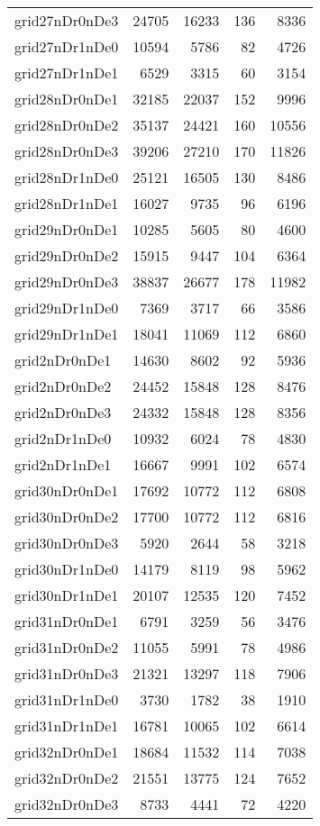 \begin{longtable}{lrrrr}
grid27nDr0nDe3 & 24705 & 16233 & 136 & 8336 \\
grid27nDr1nDe0 & 10594 & 5786 & 82 & 4726 \\
grid27nDr1nDe1 & 6529 & 3315 & 60 & 3154 \\
grid28nDr0nDe1 & 32185 & 22037 & 152 & 9996 \\
grid28nDr0nDe2 & 35137 & 24421 & 160 & 10556 \\
grid28nDr0nDe3 & 39206 & 27210 & 170 & 11826 \\
grid28nDr1nDe0 & 25121 & 16505 & 130 & 8486 \\
grid28nDr1nDe1 & 16027 & 9735 & 96 & 6196 \\
grid29nDr0nDe1 & 10285 & 5605 & 80 & 4600 \\
grid29nDr0nDe2 & 15915 & 9447 & 104 & 6364 \\
grid29nDr0nDe3 & 38837 & 26677 & 178 & 11982 \\
grid29nDr1nDe0 & 7369 & 3717 & 66 & 3586 \\
grid29nDr1nDe1 & 18041 & 11069 & 112 & 6860 \\
grid2nDr0nDe1 & 14630 & 8602 & 92 & 5936 \\
grid2nDr0nDe2 & 24452 & 15848 & 128 & 8476 \\
grid2nDr0nDe3 & 24332 & 15848 & 128 & 8356 \\
grid2nDr1nDe0 & 10932 & 6024 & 78 & 4830 \\
grid2nDr1nDe1 & 16667 & 9991 & 102 & 6574 \\
grid30nDr0nDe1 & 17692 & 10772 & 112 & 6808 \\
grid30nDr0nDe2 & 17700 & 10772 & 112 & 6816 \\
grid30nDr0nDe3 & 5920 & 2644 & 58 & 3218 \\
grid30nDr1nDe0 & 14179 & 8119 & 98 & 5962 \\
grid30nDr1nDe1 & 20107 & 12535 & 120 & 7452 \\
grid31nDr0nDe1 & 6791 & 3259 & 56 & 3476 \\
grid31nDr0nDe2 & 11055 & 5991 & 78 & 4986 \\
grid31nDr0nDe3 & 21321 & 13297 & 118 & 7906 \\
grid31nDr1nDe0 & 3730 & 1782 & 38 & 1910 \\
grid31nDr1nDe1 & 16781 & 10065 & 102 & 6614 \\
grid32nDr0nDe1 & 18684 & 11532 & 114 & 7038 \\
grid32nDr0nDe2 & 21551 & 13775 & 124 & 7652 \\
grid32nDr0nDe3 & 8733 & 4441 & 72 & 4220 \\

\end{longtable}
